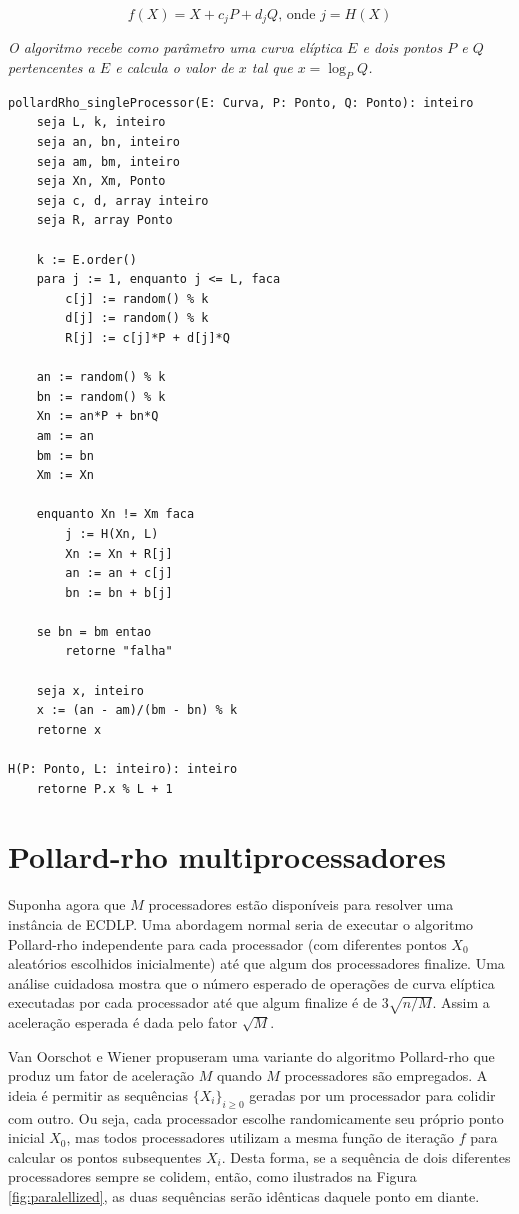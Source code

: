 \begin{equation*}
f(X) = X + c_jP + d_jQ \textrm{, onde } j = H(X)
\end{equation*}

\textit{O algoritmo recebe como parâmetro uma curva elíptica \(E\) e dois pontos \(P\) e \(Q\) pertencentes a \(E\) e calcula o valor de \(x\) tal que $x = \log_P Q$.}

% 
%
\begin{lstlisting}[caption={Algoritmo Pollard-rho com único processador.},label=single_processor]
pollardRho_singleProcessor(E: Curva, P: Ponto, Q: Ponto): inteiro
	seja L, k, inteiro
	seja an, bn, inteiro
	seja am, bm, inteiro
	seja Xn, Xm, Ponto
	seja c, d, array inteiro
	seja R, array Ponto

	k := E.order()
	para j := 1, enquanto j <= L, faca
		c[j] := random() % k
		d[j] := random() % k
		R[j] := c[j]*P + d[j]*Q

	an := random() % k
	bn := random() % k
	Xn := an*P + bn*Q
	am := an
	bm := bn
	Xm := Xn

	enquanto Xn != Xm faca
		j := H(Xn, L)
		Xn := Xn + R[j]
		an := an + c[j]
		bn := bn + b[j]

	se bn = bm entao
		retorne "falha"

	seja x, inteiro
	x := (an - am)/(bm - bn) % k
	retorne x

H(P: Ponto, L: inteiro): inteiro
	retorne P.x % L + 1

\end{lstlisting}

%
%
\section{Pollard-rho multiprocessadores}
Suponha agora que \(M\) processadores estão disponíveis para resolver uma instância de ECDLP. Uma abordagem normal seria de executar o algoritmo Pollard-rho independente para cada processador (com diferentes pontos \(X_0\) aleatórios escolhidos inicialmente) até que algum dos processadores finalize. Uma análise cuidadosa mostra que o número esperado de operações de curva elíptica executadas por cada processador até que algum finalize é de $3\sqrt{n/M}$. Assim a aceleração esperada é dada pelo fator $\sqrt{M}$. \cite{Guide}

Van Oorschot e Wiener propuseram uma variante do algoritmo Pollard-rho que produz um fator de aceleração \(M\) quando \(M\) processadores são empregados. A ideia é permitir as sequências $\{X_i\}_{i \geq 0}$ geradas por um processador para colidir com outro. Ou seja, cada processador escolhe randomicamente seu próprio ponto inicial \(X_0\), mas todos processadores utilizam a mesma função de iteração \(f\) para calcular os pontos subsequentes \(X_i\). Desta forma, se a sequência de dois diferentes processadores sempre se colidem, então, como ilustrados na Figura \ref{fig:paralellized}, as duas sequências serão idênticas daquele ponto em diante. \cite{Van:1996}

